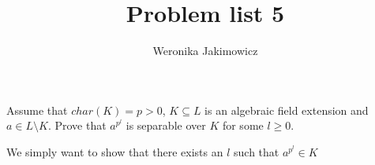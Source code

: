\documentclass{article}
\title{Problem list 5}
\author{Weronika Jakimowicz}
\date{}
\begin{document}
\maketitle

\begin{problem}[1]{}
Assume that $char(K)=p>0$, $K\subseteq L$ is an algebraic field extension and $a\in L\setminus K$. Prove that $a^{p^l}$ is separable over $K$ for some $l\geq 0$.
\end{problem}

We simply want to show that there exists an $l$ such that $a^{p^l}\in K$
\end{document}
